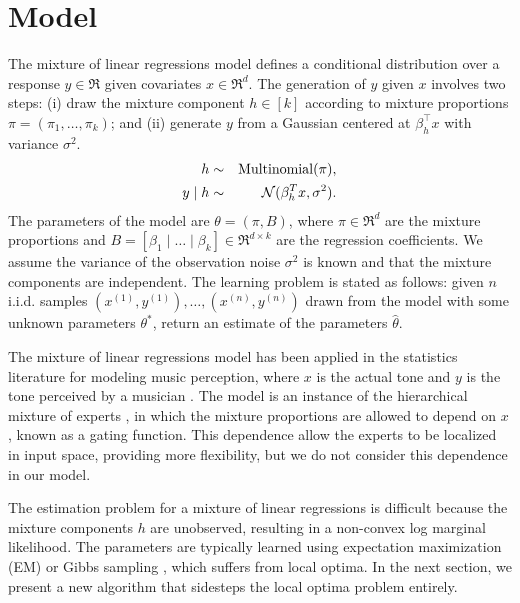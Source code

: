 \section{Model}
\label{sec:model}

\newcommand{\xn}[1]{x^{(#1)}}
\newcommand{\xni}{\xn{i}}
\newcommand{\yn}[1]{y^{(#1)}}
\newcommand{\yni}{\yn{i}}

The mixture of linear regressions model \citep{VieleTong2002} defines
a conditional distribution over a response $y \in \Re$
given covariates $x \in \Re^d$.
The generation of $y$ given $x$ involves two steps:
(i) draw the mixture component $h \in [k]$ according to mixture proportions
$\pi = (\pi_1, \dots, \pi_k)$;
and (ii) generate $y$ from a Gaussian centered at $\beta_h^\top x$ with
variance $\sigma^2$.
\begin{eqnarray*}
  h &\sim& \operatorname{Multinomial}(\pi), \\
  y \mid h &\sim& \mathcal{N}( \beta_{h}^T x,  \sigma^2 ).
\end{eqnarray*}
The parameters of the model are $\theta = (\pi, B)$,
where $\pi \in \Re^d$ are the mixture proportions and
$B = [\beta_1 \mid \dots \mid \beta_k] \in \Re^{d \times k}$
are the regression coefficients.
We assume the variance of the observation noise $\sigma^2$ is known and that the mixture components are independent.
The learning problem is stated as follows:
given $n$ i.i.d. samples $(\xn{1}, \yn{1}), \dots, (\xn{n}, \yn{n})$
drawn from the model with some unknown parameters $\theta^*$,
return an estimate of the parameters $\hat\theta$.

The mixture of linear regressions model has been applied
in the statistics literature for modeling music perception, where $x$ is the
actual tone and $y$ is the tone perceived by a musician \cite{VieleTong2002}.
The model is an instance of the hierarchical mixture of experts
\cite{jacobs91experts}, in which the mixture proportions are allowed to depend
on $x$, known as a gating function.
This dependence allow the experts to be localized in input space,
providing more flexibility, but we do not consider this dependence in our model.

The estimation problem for a mixture of linear regressions is difficult because
the mixture components $h$ are unobserved,
resulting in a non-convex log marginal likelihood.
The parameters are typically learned using
expectation maximization (EM) or Gibbs sampling \cite{VieleTong2002},
which suffers from local optima.
In the next section, we present a new algorithm
that sidesteps the local optima problem entirely.
